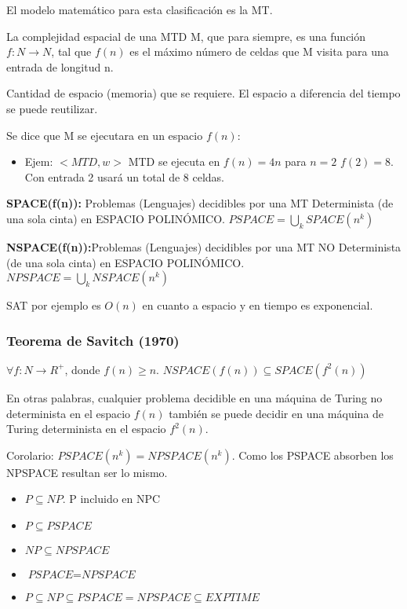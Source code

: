 El modelo matemático para esta clasificación es la MT.

La complejidad espacial de una MTD M, que para siempre, es una función $f: N \rightarrow N$, tal que $f(n)$ es el máximo número de celdas que M visita para una entrada de longitud n.

Cantidad de espacio (memoria) que se requiere. El espacio a diferencia del tiempo se puede reutilizar.

Se dice que M se ejecutara en un espacio $f(n)$:
\begin{itemize}
  \item Ejem: $<MTD, w>$ MTD se ejecuta en $f(n)=4n$ para $n=2$ $f(2)=8$. Con entrada 2 usará un total de 8 celdas. 
\end{itemize}

\textbf{SPACE(f(n)):} Problemas (Lenguajes) decidibles por una MT Determinista (de una sola cinta) en ESPACIO POLINÓMICO. $PSPACE=\bigcup_k SPACE(n^k)$

\textbf{NSPACE(f(n)):}Problemas (Lenguajes) decidibles por una MT NO Determinista (de una sola cinta) en ESPACIO POLINÓMICO. $NPSPACE=\bigcup_k NSPACE(n^k)$

SAT por ejemplo es $O(n)$ en cuanto a espacio y en tiempo es exponencial.

\subsubsection{Teorema de Savitch (1970)}
$\forall f: N \rightarrow R^+$, donde $f(n)\geq n$. $\textit{NSPACE}(f(n)) \subseteq \textit{SPACE}(f^2(n))$

En otras palabras, cualquier problema decidible en una máquina de Turing no determinista en el espacio $f(n)$ también se puede decidir en una máquina de Turing determinista en el espacio $f^2(n)$.

Corolario: $\textit{PSPACE}(n^k)=\textit{NPSPACE}(n^k)$. Como los PSPACE absorben los NPSPACE resultan ser lo mismo.
\begin{itemize}
  \item $P \subseteq NP$. P incluido en NPC
  \item $P \subseteq \textit{PSPACE}$
  \item $NP \subseteq \textit{NPSPACE}$
  \item $\textit{PSPACE} = \textit{NPSPACE}$
  \item $P \subseteq NP \subseteq \textit{PSPACE}=\textit{NPSPACE} \subseteq \textit{EXPTIME}$
\end{itemize}